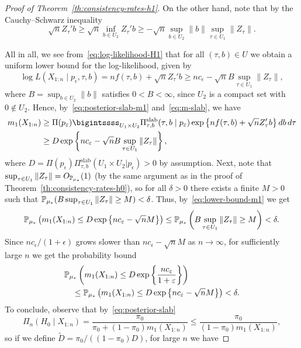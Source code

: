 \begin{proof}[Proof of Theorem~\ref{th:consistency-rates-h1}]
On the other hand, note that by the Cauchy--Schwarz inequality
\[
\sqrt{n} Z_\tau'b \geq \sqrt{n} \inf_{b\in U_2} Z_\tau'b \geq -\sqrt{n} \sup_{b\in U_2} \|b\| \sup_{\tau \in U_1}\|Z_\tau\|.
\]

All in all, we see from~\eqref{eq:log-likelihood-H1} that for all \((\tau, b)\in U\) we obtain a uniform lower bound for the log-likelihood, given by
\[
\log L(X_{1:n}\mid p_\epsilon, \tau, b) = nf(\tau, b) +  \sqrt{n}Z_\tau'b \geq nc_\epsilon - \sqrt{n}B \sup_{\tau\in U_1}\|Z_\tau\|,
\]
where \(B=\sup_{b\in U_2} \|b\|\) satisfies \(0 < B < \infty\), since \(U_2\) is a compact set with \(0\notin U_2\). Hence, by~\eqref{eq:posterior-slab-m1} and~\eqref{eq:m-slab}, we have
\begin{equation}\label{eq:lower-bound-m1}
  \begin{split}
  m_1(X_{1:n}) &\geq \Pi(p_\epsilon) \bigintssss_{U_1\times U_2}\Pi_{\tau,b}^{\text{slab}}(\tau, b\mid p_\epsilon) \exp\left\{nf(\tau, b) +  \sqrt{n}Z_\tau'b\right\}db\, d\tau \\
  &\geq D \exp\left\{nc_\epsilon - \sqrt{n}B \sup_{\tau\in U_1}\|Z_\tau\|\right\},
  \end{split}
\end{equation}
where \(D=\Pi(p_\epsilon)\Pi_{\tau, b}^{\text{slab}}(U_1 \times U_2|p_{\epsilon})>0\) by assumption. Next, note that \(\sup_{\tau\in U_1}\|Z_\tau\|=O_{\mathbb{P}_{\mu_*}}(1)\) (by the same argument as in the proof of Theorem~\ref{th:consistency-rates-h0}), so for all \(\delta>0\) there exists a finite \(M>0\) such that \(\mathbb{P}_{\mu_*}(B \sup_{\tau\in U_1} \|Z_\tau\| \geq M) < \delta\). Thus, by~\eqref{eq:lower-bound-m1} we get
\[
\mathbb{P}_{\mu_*}\left(m_1(X_{1:n}) \leq D \exp\left\{nc_\varepsilon - \sqrt{n}M\right\}\right) \leq  \mathbb{P}_{\mu_*}\left(B \sup_{\tau\in U_1} \|Z_\tau\| \geq M\right) < \delta.
\]
Since \(nc_\epsilon/(1+\epsilon)\) grows slower than \(nc_\epsilon - \sqrt{n}M\) as \(n\to\infty\), for sufficiently large \(n\) we get the probability bound
\begin{align*}
&\mathbb{P}_{\mu_*}\left(m_1(X_{1:n}) \leq D \exp\left\{\frac{nc_\varepsilon}{1+\varepsilon}\right\}\right)\\
 &\quad \leq \mathbb{P}_{\mu_*}\left(m_1(X_{1:n})\leq D \exp\left\{nc_\varepsilon - \sqrt{n}M\right\}\right) < \delta.
\end{align*}
To conclude, observe that by~\eqref{eq:posterior-slab}
\[
\Pi_n(H_0\mid X_{1:n}) = \frac{\pi_0}{\pi_0 + (1-\pi_0)m_1(X_{1:n})} \leq \frac{\pi_0}{(1-\pi_0)m_1(X_{1:n})},
\]
so if we define \(\tilde{D}=\pi_0/((1-\pi_0)D)\), for large \(n\) we have

\end{proof}
